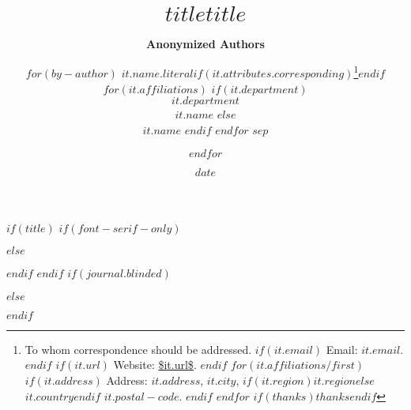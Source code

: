 $if(title)$
$if(font-serif-only)$
\title{\bfseries\huge $title$}
$else$
\title{\sffamily\bfseries\huge $title$}
$endif$
$endif$
$if(journal.blinded)$
\author{\textbf{Anonymized Authors}}
$else$
\author{$for(by-author)$
\textbf{$it.name.literal$}$if(it.attributes.corresponding)$\footnote{
To whom correspondence should be addressed.
$if(it.email)$
Email: \texttt{\href{mailto:$it.email$}{$it.email$}}.
$endif$
$if(it.url)$
Website: \url{$it.url$}.
$endif$
$for(it.affiliations/first)$
$if(it.address)$
Address:
$it.address$, $it.city$, $if(it.region)$$it.region$$else$$it.country$$endif$ $it.postal-code$.
$endif$
$endfor$
$if(thanks)$$thanks$$endif$}$endif$
$for(it.affiliations)$
$if(it.department)$
\\$it.department$\\$it.name$
$else$
\\$it.name$
$endif$
\vspace{0.05in}
$endfor$ $sep$
\and $endfor$}
$endif$
\date{$date$}